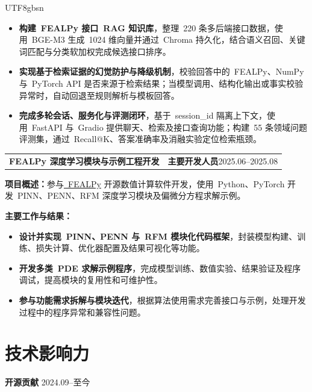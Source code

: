 \documentclass[10.5pt,a4paper]{article}
\makeatletter
\newcommand{\resumeItem}[1]{\item #1}
\newcommand{\projectHeader}[3]{%
  \noindent
  \begin{tabular*}{\textwidth}{@{\extracolsep{\fill}}lr}
    \textbf{#1} &
    \textbf{#2}\hspace{1.5em}#3
  \end{tabular*}

  \vspace{0.15em}
}
\newcommand{\subTitle}[2]{
  \textbf{#1}
  \hfill
  #2
}
\makeatother
\begin{document}
\begin{CJK*}{UTF8}{gbsn}
\begin{itemize}
\resumeItem{\textbf{构建\ FEALPy 接口\ RAG 知识库}，整理\ 220 条多后端接口数据，使用\ BGE-M3 生成\ 1024 维向量并通过\ Chroma 持久化，结合语义召回、关键词匹配与分类软加权完成候选接口排序。}

\resumeItem{\textbf{实现基于检索证据的幻觉防护与降级机制}，校验回答中的\ FEALPy、NumPy 与\ PyTorch API 是否来源于检索结果；当模型调用、结构化输出或事实校验异常时，自动回退至规则解析与模板回答。}

\resumeItem{\textbf{完成多轮会话、服务化与评测闭环}，基于\ session\_id 隔离上下文，使用\ FastAPI 与\ Gradio 提供聊天、检索及接口查询功能；构建\ 55 条领域问题评测集，通过\ Recall@K、答案准确率及消融实验定位检索瓶颈。}

\end{itemize}

\vspace{0.7em}

\projectHeader
{FEALPy 深度学习模块与示例工程开发}
{主要开发人员}
{2025.06--2025.08}

\smallskip

\textbf{项目概述：}{参与\href{https://github.com/chenchunmei-daphne/fealpy}{\ FEALPy} 开源数值计算软件开发，使用\ Python、PyTorch 开发\ PINN、PENN、RFM 深度学习模块及偏微分方程求解示例。}

\par \medskip
\textbf{主要工作与结果：}
\begin{itemize}

\resumeItem{\textbf{设计并实现\ PINN、PENN 与\ RFM 模块化代码框架}，封装模型构建、训练、损失计算、优化器配置及结果可视化等功能。}

\resumeItem{\textbf{开发多类\ PDE 求解示例程序}，完成模型训练、数值实验、结果验证及程序调试，提高模块的复用性和可维护性。}

\resumeItem{\textbf{参与功能需求拆解与模块迭代}，根据算法使用需求完善接口与示例，处理开发过程中的程序异常和兼容性问题。}
\end{itemize}

\vspace{0.7em}

\section*{技术影响力}

\subTitle{开源贡献}{2024.09--至今}

\begin{itemize}


\end{itemize}
\end{CJK*}
\end{document}
